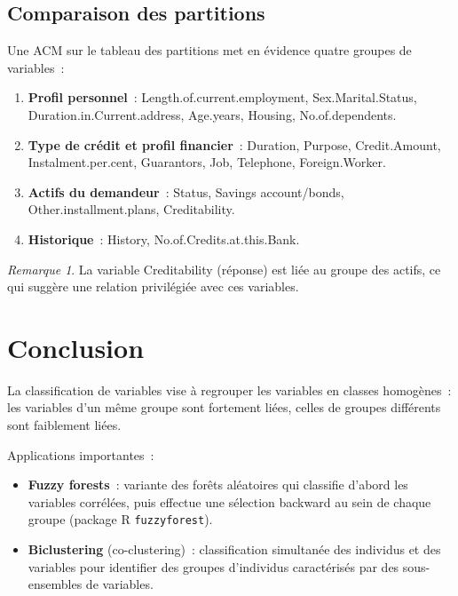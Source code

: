 \documentclass[a4paper,11pt]{article}
\theoremstyle{definition}
\theoremstyle{remark}
\newtheorem*{remark}{Remarque}
\begin{document}
\subsection{Comparaison des partitions}

Une ACM sur le tableau des partitions met en \'evidence quatre
groupes de variables~:

\begin{enumerate}
  \item \textbf{Profil personnel}~: Length.of.current.employment,
    Sex.Marital.Status, Duration.in.Current.address, Age.years,
    Housing, No.of.dependents.
  \item \textbf{Type de cr\'edit et profil financier}~: Duration,
    Purpose, Credit.Amount, Instalment.per.cent, Guarantors, Job,
    Telephone, Foreign.Worker.
  \item \textbf{Actifs du demandeur}~: Status, Savings account/bonds,
    Other.installment.plans, Creditability.
  \item \textbf{Historique}~: History, No.of.Credits.at.this.Bank.
\end{enumerate}

\begin{remark}
  La variable Creditability (r\'eponse) est li\'ee au groupe des
  actifs, ce qui sugg\`ere une relation privil\'egi\'ee avec ces
  variables.
\end{remark}

\section{Conclusion}

La classification de variables vise \`a regrouper les variables en
classes homog\`enes~: les variables d'un m\^eme groupe sont
fortement li\'ees, celles de groupes diff\'erents sont faiblement
li\'ees.

Applications importantes~:
\begin{itemize}
  \item \textbf{Fuzzy forests}~: variante des for\^ets al\'eatoires
    qui classifie d'abord les variables corr\'el\'ees, puis effectue
    une s\'election backward au sein de chaque groupe (package R
    \texttt{fuzzyforest}).
  \item \textbf{Biclustering} (co-clustering)~: classification
    simultan\'ee des individus et des variables pour identifier des
    groupes d'individus caract\'eris\'es par des sous-ensembles de
    variables.
\end{itemize}
\end{document}
